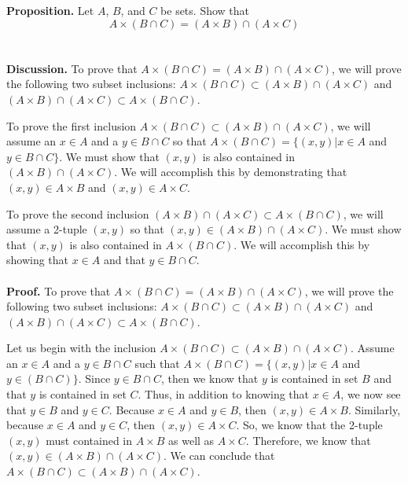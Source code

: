 \documentclass[12pt]{exam}
\begin{document}
\begin{questions}
\question
\textbf{Proposition.} Let $A$, $B$, and $C$ be sets. Show that
\begin{equation*}
A \times (B \cap C) = (A \times B) \cap (A \times C)
\end{equation*}
\\
\\\textbf{Discussion.} To prove that $A \times (B \cap C) = (A \times B) \cap (A \times C)$, we will prove the following two subset inclusions: $A \times (B \cap C) \subset (A \times B) \cap (A \times C)$ and $(A \times B) \cap (A \times C) \subset A \times (B \cap C)$. 
\par 
To prove the first inclusion $A \times (B \cap C) \subset (A \times B) \cap (A \times C)$, we will assume an $x \in A$ and a $y \in B \cap C$ so that $A \times (B \cap C) = \{(x, y) | x \in A$ and $y \in B \cap C\}$. We must show that $(x,y)$ is also contained in $(A \times B) \cap (A \times C)$. We will accomplish this by demonstrating that $(x,y) \in A \times B$ and $(x, y) \in A \times C$.
\par
To prove the second inclusion $(A \times B) \cap (A \times C) \subset A \times (B \cap C)$, we will assume a 2-tuple $(x, y)$ so that $(x, y) \in (A \times B) \cap (A \times C)$. We must show that $(x, y)$ is also contained in $A \times (B \cap C)$. We will accomplish this by showing that $x \in A$ and that $y \in B \cap C$.
\\
\\\textbf{Proof.} To prove that $A \times (B \cap C) = (A \times B) \cap (A \times C)$, we will prove the following two subset inclusions: $A \times (B \cap C) \subset (A \times B) \cap (A \times C)$ and $(A \times B) \cap (A \times C) \subset A \times (B \cap C)$. 
\par
Let us begin with the inclusion $A \times (B \cap C) \subset (A \times B) \cap (A \times C)$. Assume an $x \in A$ and a $y \in B \cap C$ such that $A \times (B \cap C) = \{(x, y) | x \in A$ and $y \in (B \cap C)\}$. Since $y \in B \cap C$, then we know that $y$ is contained in set $B$ and that $y$ is contained in set $C$. Thus, in addition to knowing that $x\in A$, we now see that $y \in B$ and $y \in C$. Because $x \in A$ and $y \in B$, then $(x,y) \in A \times B$. Similarly, because $x \in A$ and $y \in C$, then $(x,y) \in A \times C$. So, we know that the 2-tuple $(x,y)$ must contained in $A \times B$ as well as $A \times C$. Therefore, we know that $(x,y) \in (A \times B) \cap (A \times C)$. We can conclude that $A \times (B \cap C) \subset (A \times B) \cap (A \times C)$.

\end{questions}
\end{document}
